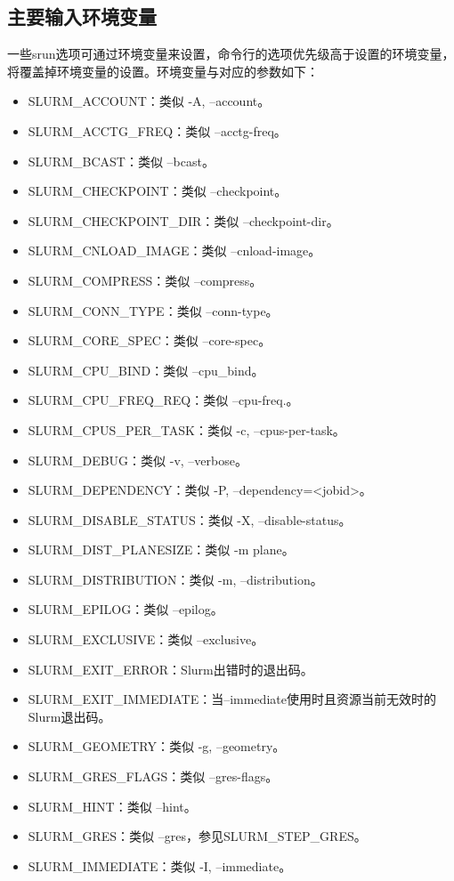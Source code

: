 \subsection{主要输入环境变量}
一些srun选项可通过环境变量来设置，命令行的选项优先级高于设置的环境变量，将覆盖掉环境变量的设置。环境变量与对应的参数如下：
\begin{itemize}
	\item SLURM\_ACCOUNT：类似 -A, --account。
	\item SLURM\_ACCTG\_FREQ：类似 --acctg-freq。
	\item SLURM\_BCAST：类似 --bcast。
	\item SLURM\_CHECKPOINT：类似 --checkpoint。
	\item SLURM\_CHECKPOINT\_DIR：类似 --checkpoint-dir。
	\item SLURM\_CNLOAD\_IMAGE：类似 --cnload-image。
	\item SLURM\_COMPRESS：类似 --compress。
	\item SLURM\_CONN\_TYPE：类似 --conn-type。
	\item SLURM\_CORE\_SPEC：类似 --core-spec。
	\item SLURM\_CPU\_BIND：类似 --cpu\_bind。
	\item SLURM\_CPU\_FREQ\_REQ：类似 --cpu-freq.。
	\item SLURM\_CPUS\_PER\_TASK：类似 -c, --cpus-per-task。
	\item SLURM\_DEBUG：类似 -v, --verbose。
	\item SLURM\_DEPENDENCY：类似 -P, --dependency=<jobid>。
	\item SLURM\_DISABLE\_STATUS：类似 -X, --disable-status。
	\item SLURM\_DIST\_PLANESIZE：类似 -m plane。
	\item SLURM\_DISTRIBUTION：类似 -m, --distribution。
	\item SLURM\_EPILOG：类似 --epilog。
	\item SLURM\_EXCLUSIVE：类似 --exclusive。
	\item SLURM\_EXIT\_ERROR：Slurm出错时的退出码。
	\item SLURM\_EXIT\_IMMEDIATE：当--immediate使用时且资源当前无效时的Slurm退出码。
	\item SLURM\_GEOMETRY：类似 -g, --geometry。
	\item SLURM\_GRES\_FLAGS：类似 --gres-flags。
	\item SLURM\_HINT：类似 --hint。
	\item SLURM\_GRES：类似 --gres，参见SLURM\_STEP\_GRES。
	\item SLURM\_IMMEDIATE：类似 -I, --immediate。

\end{itemize}
